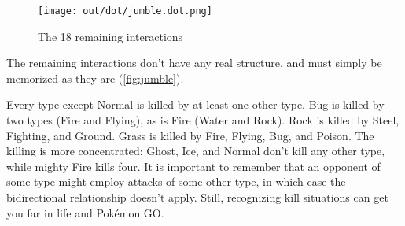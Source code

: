 \begin{figure}[ht]
\centering
\texttt{[image: out/dot/jumble.dot.png]}
\caption{The 18 remaining interactions\label{fig:jumble}}
\end{figure}
\noindent{}The remaining interactions don't have any real structure, and must simply be
memorized as they are (\autoref{fig:jumble}).

Every type except Normal is killed by at least one other type.
Bug is killed by two types (Fire and Flying), as is Fire (Water and Rock).
Rock is killed by Steel, Fighting, and Ground.
Grass is killed by Fire, Flying, Bug, and Poison.
The killing is more concentrated: Ghost, Ice, and Normal don't kill
  any other type, while mighty Fire kills four.
It is important to remember that an opponent of some type might
  employ attacks of some other type, in which case the bidirectional
  relationship doesn't apply.
Still, recognizing kill situations can get you
  far in life and Pokémon GO\@.

